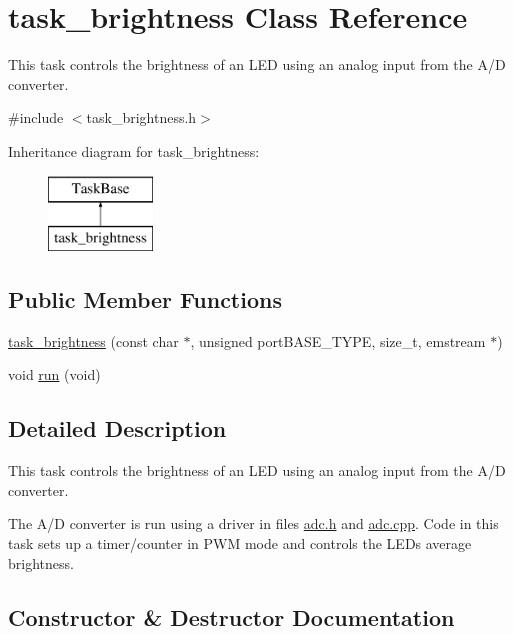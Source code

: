 \hypertarget{classtask__brightness}{}\section{task\+\_\+brightness Class Reference}
\label{classtask__brightness}


This task controls the brightness of an L\+ED using an analog input from the A/D converter.  




{\ttfamily \#include $<$task\+\_\+brightness.\+h$>$}

Inheritance diagram for task\+\_\+brightness\+:\begin{figure}[H]
\begin{center}
\leavevmode
\includegraphics[height=2.000000cm]{classtask__brightness}
\end{center}
\end{figure}
\subsection*{Public Member Functions}
\begin{DoxyCompactItemize}
\item 
\hyperlink{classtask__brightness_a5802baf3a0c9fe53ccbce8966d1fad47}{task\+\_\+brightness} (const char $\ast$, unsigned port\+B\+A\+S\+E\+\_\+\+T\+Y\+PE, size\+\_\+t, emstream $\ast$)
\item 
void \hyperlink{classtask__brightness_a615beac07a99f0856f048a46fd9a3898}{run} (void)
\end{DoxyCompactItemize}


\subsection{Detailed Description}
This task controls the brightness of an L\+ED using an analog input from the A/D converter. 

The A/D converter is run using a driver in files {\ttfamily \hyperlink{adc_8h}{adc.\+h}} and {\ttfamily \hyperlink{adc_8cpp}{adc.\+cpp}}. Code in this task sets up a timer/counter in P\+WM mode and controls the L\+ED\textquotesingle{}s average brightness. 

\subsection{Constructor \& Destructor Documentation}
